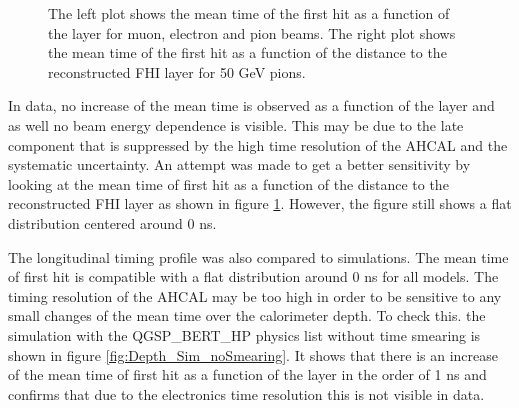\begin{figure}[htbp!]
\begin{subfigure}[t]{0.49\textwidth}
		\caption{}\label{fig:Depth_Comparison_FHI}
	\end{subfigure}
	\caption{The left plot shows the mean time of the first hit as a function of the layer for muon, electron and pion beams. The right plot shows the mean time of the first hit as a function of the distance to the reconstructed FHI layer for 50 GeV pions.}
	\label{fig:DepthProfile}
\end{figure}

In data, no increase of the mean time is observed as a function of the layer and as well no beam energy dependence is visible. This may be due to the late component that is suppressed by the high time resolution of the AHCAL and the systematic uncertainty. An attempt was made to get a better sensitivity by looking at the mean time of first hit as a function of the distance to the reconstructed FHI layer as shown in figure \ref{fig:Depth_Comparison_FHI}. However, the figure still shows a flat distribution centered around 0 ns.

The longitudinal timing profile was also compared to simulations. The mean time of first hit is compatible with a flat distribution around 0 ns for all models. The timing resolution of the AHCAL may be too high in order to be sensitive to any small changes of the mean time over the calorimeter depth. To check this. the simulation with the QGSP\_BERT\_HP physics list without time smearing is shown in figure \ref{fig:Depth_Sim_noSmearing}. It shows that there is an increase of the mean time of first hit as a function of the layer in the order of 1 ns and confirms that due to the electronics time resolution this is not visible in data.

